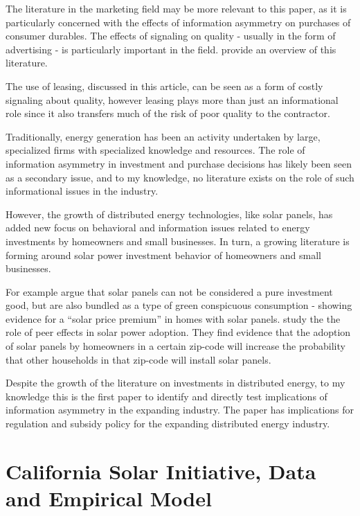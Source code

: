 \documentclass[12pt]{article}
\begin{document}
The literature in the marketing field may be more relevant to this paper, as it is particularly concerned with the effects of information asymmetry on purchases of consumer durables. The effects of signaling on quality - usually in the form of advertising - is particularly important in the field. \citet{kirmani_no_2000} provide an overview of this literature. 

The use of leasing, discussed in this article, can be seen as a form of costly signaling about quality, however leasing plays more than just an informational role since it also transfers much of the risk of poor quality to the contractor.

Traditionally, energy generation has been an activity undertaken by large, specialized firms with specialized knowledge and resources. The role of information asymmetry in investment and purchase decisions has likely been seen as a secondary issue, and to my knowledge, no literature exists on the role of such informational issues in the industry. 

However, the growth of distributed energy technologies, like solar panels, has added new focus on behavioral and information issues related to energy investments by homeowners and small businesses. In turn, a growing literature is forming around solar power investment behavior of homeowners and small businesses. 

For example \citet{dastrup_understanding_2012} argue that solar panels can not be considered a pure investment good, but are also bundled as a type of green conspicuous consumption - showing evidence for a ``solar price premium'' in homes with solar panels. \citet{bollinger_peer_2012} study the the role of peer effects in solar power adoption. They find evidence that the adoption of solar panels by homeowners in a certain zip-code will increase the probability that other households in that zip-code will install solar panels.

Despite the growth of the literature on investments in distributed energy, to my knowledge this is the first paper to identify and directly test implications of information asymmetry in the expanding industry. The paper has implications for regulation and subsidy policy for the expanding distributed energy industry. 

\section{California Solar Initiative, Data and Empirical Model}
\end{document}
